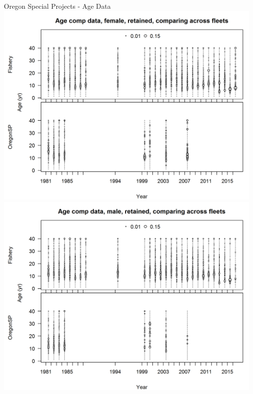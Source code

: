\documentclass[pdf]{beamer}\usepackage[]{graphicx}\usepackage[]{color}
\begin{document}
\begin{frame}{Oregon Special Projects - Age Data}
  \includegraphics[scale = 0.37]{figures/OR_sp_agecomp_female.png}
  \includegraphics[scale = 0.37]{figures/OR_sp_agecomp_male.png}
\end{frame}
\end{document}
